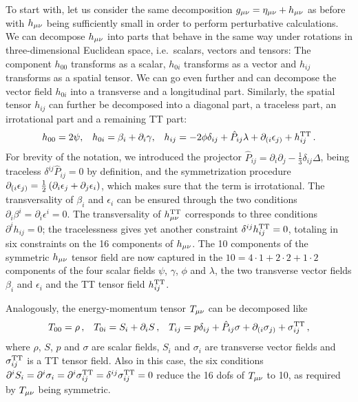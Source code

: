 To start with, let us consider the same decomposition $g_{{\mu \nu}} = \eta_{{\mu \nu}} + h_{{\mu \nu}}$ as before with $h_{{\mu \nu}}$ being sufficiently small in order to perform perturbative calculations. We can decompose $h_{{\mu \nu}}$ into parts that behave in the same way under rotations in three-dimensional Euclidean space, i.e.~scalars, vectors and tensors: The component $h_{00}$ transforms as a scalar, $h_{0i}$ transforms as a vector and $h_{ij}$ transforms as a spatial tensor. We can go even further  and can decompose the vector field $h_{0i}$ into a transverse and a longitudinal part. Similarly, the spatial tensor $h_{ij}$ can further be decomposed into a diagonal part, a traceless part, an irrotational part and a remaining \ac{TT} part:
\begin{align}
	h_{00} = 2 \psi,&& h_{0i} = \beta_i + \partial_i \gamma , &&
	h_{ij} = -2\phi \delta_{ij} + \hat{P}_{ij} \lambda + \partial_{(i} \epsilon_{j)} + h_{ij}^{\text{TT}} \, . \label{eq:hSVT}
\end{align}
For brevity of the notation, we introduced the projector $\hat{P}_{ij} = \partial_i \partial_j - \frac{1}{3} \delta_{ij} \Delta$, being traceless $\delta^{ij} \hat{P}_{ij} = 0$ by definition, and the symmetrization procedure $\partial_{(i} \epsilon_{j)} = \frac{1}{2} \left( \partial_i \epsilon_j + \partial_j \epsilon_i \right)$, which makes sure that the term is irrotational. The transversality of $\beta_i$ and $\epsilon_i$ can be ensured through the two conditions $\partial_i \beta^i = \partial_i \epsilon^i = 0$. The transversality of $h_{{\mu \nu}}^{\text{TT}}$ corresponds to three conditions $\partial^i h_{ij} = 0$; the tracelessness gives yet another constraint $\delta^{ij} h_{ij}^{\text{TT}} = 0$, totaling in six constraints on the 16 components of $h_{{\mu \nu}}$. The 10 components of the symmetric $h_{{\mu \nu}}$ tensor field are now captured in the  $10 = 4 \cdot 1 + 2 \cdot 2 + 1 \cdot 2$ components of the four scalar fields $\psi$, $\gamma$, $\phi$ and $\lambda$, the two transverse vector fields $\beta_i$ and $\epsilon_i$ and the \ac{TT} tensor field $h_{ij}^{\text{TT}}$.

Analogously, the energy-momentum tensor $T_{{\mu \nu}}$ can be decomposed like
\begin{align}
	T_{00} = \rho \, ,&& T_{0i} = S_i + \partial_i S \, ,&&T_{ij} = p \delta_{ij} + \hat{P}_{ij} \sigma + \partial_{(i} \sigma_{j)} + \sigma_{ij}^{\text{TT}} \, , \label{eq:TSVT}
\end{align}
where $\rho$, $S$, $p$ and $\sigma$ are scalar fields, $S_i$ and $\sigma_i$ are transverse vector fields and $\sigma_{ij}^{\text{TT}}$ is a \ac{TT}  tensor field. Also in this case, the six conditions $\partial^i S_i = \partial^i \sigma_i = \partial^i \sigma_{ij}^{\text{TT}} = \delta^{ij} \sigma_{ij}^{\text{TT}} = 0$ reduce the 16 \acp{dof} of $T_{{\mu \nu}}$ to 10, as required by $T_{{\mu \nu}}$ being symmetric.

